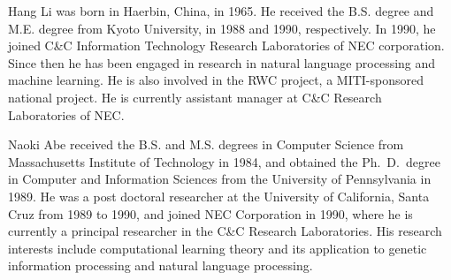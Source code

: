 \begin{biography}

\biotitle{}

 { Hang Li was born in Haerbin, China, in 1965. He
  received the B.S. degree and M.E. degree from Kyoto University, in
  1988 and 1990, respectively. In 1990, he joined C\&C Information
  Technology Research Laboratories of NEC corporation. Since then he
  has been engaged in research in natural language processing and
  machine learning. He is also involved in the RWC project, a 
  MITI-sponsored national project. He is currently assistant manager at
  C\&C Research Laboratories of NEC.}

 { Naoki Abe received the B.S. and M.S. degrees
  in Computer Science from Massachusetts Institute of Technology in
  1984, and obtained the Ph.\ D.\ degree in Computer and Information
  Sciences from the University of Pennsylvania in 1989. He was a post
  doctoral researcher at the University of California, Santa Cruz from
  1989 to 1990, and joined NEC Corporation in 1990, where he is
  currently a principal researcher in the C\&C Research Laboratories.
  His research interests include computational learning theory and its
  application to genetic information processing and natural language
  processing. }


\end{biography}




